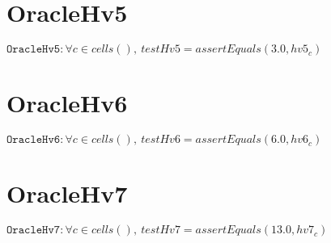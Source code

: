 \documentclass[11pt]{article}
\begin{document}
\section{OracleHv5}
$\texttt{OracleHv5} : \forall{c\in cells()}, \ testHv5=assertEquals\left(3.0,hv5_{c}\right)$


\section{OracleHv6}
$\texttt{OracleHv6} : \forall{c\in cells()}, \ testHv6=assertEquals\left(6.0,hv6_{c}\right)$


\section{OracleHv7}
$\texttt{OracleHv7} : \forall{c\in cells()}, \ testHv7=assertEquals\left(13.0,hv7_{c}\right)$
\end{document}
